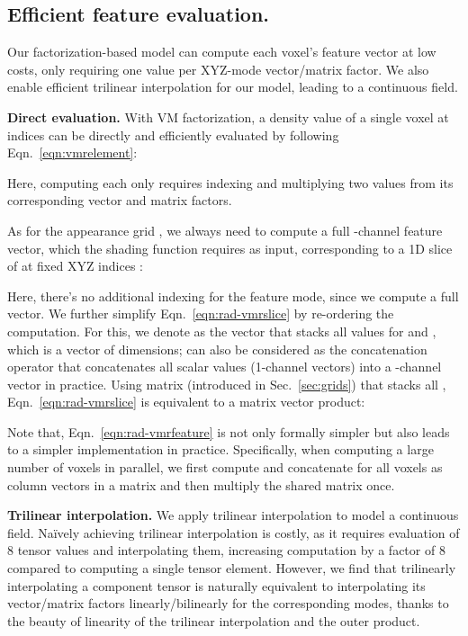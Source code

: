 \documentclass[runningheads]{llncs}
\newcommand{\boldstartspace}[1]{\vspace{0.1in}\noindent\textbf{#1}}
\begin{document}
\subsection{Efficient feature evaluation.}


Our factorization-based model can compute each voxel's feature vector at low costs, only requiring one value per XYZ-mode vector/matrix factor.
We also enable efficient trilinear interpolation for our model, leading to a continuous field.  

\boldstartspace{Direct evaluation.}
With VM factorization, a density value  of a single voxel at indices  can be directly and efficiently evaluated by following Eqn.~\ref{eqn:vmrelement}:

Here, computing each  only requires indexing and multiplying two values from its corresponding vector and matrix factors.

As for the appearance grid , we always need to compute a full 
-channel feature vector, which the shading function  requires as input, corresponding to a 1D slice of  at fixed XYZ indices :

Here, there's no additional indexing for the feature mode, since we compute a full vector.
We further simplify Eqn.~\ref{eqn:rad-vmrslice} by re-ordering the computation.
For this, we denote  as the vector that stacks all  values for  and , which is a vector of  dimensions;  can also be considered as the concatenation operator that concatenates all scalar values (1-channel vectors) into a -channel vector in practice.
Using matrix  (introduced in Sec.~\ref{sec:grids}) that stacks all , Eqn.~\ref{eqn:rad-vmrslice} is equivalent to a matrix vector product:

Note that, Eqn.~\ref{eqn:rad-vmrfeature} is not only formally simpler but also leads to a simpler implementation in practice.
Specifically, when computing a large number of voxels in parallel, we first compute and concatenate  for all voxels as column vectors in a matrix and then multiply the shared matrix  once. 







\boldstartspace{Trilinear interpolation.}
We apply trilinear interpolation to model a continuous field.
Na\"{i}vely achieving trilinear interpolation is costly, as it requires evaluation of 8 tensor values and interpolating them, increasing computation by a factor of 8 compared to computing a single tensor element.
However, we find that trilinearly interpolating a component tensor is naturally equivalent to interpolating its vector/matrix factors linearly/bilinearly for the corresponding modes, thanks to the beauty of linearity of the trilinear interpolation and the outer product.
\end{document}
